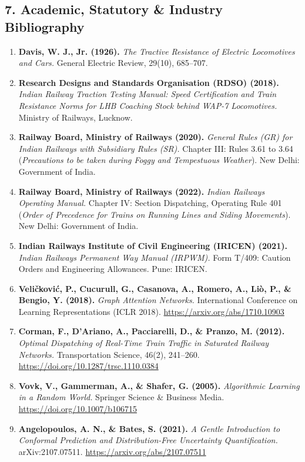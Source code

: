 \documentclass[10pt, a4paper]{article}
\begin{document}
\subsection*{7. Academic, Statutory \& Industry Bibliography}
\begin{enumerate}[leftmargin=5mm, itemsep=1.5pt]
  \item \textbf{Davis, W. J., Jr. (1926).} \textit{The Tractive Resistance of Electric Locomotives and Cars.} General Electric Review, 29(10), 685--707.
  \item \textbf{Research Designs and Standards Organisation (RDSO) (2018).} \textit{Indian Railway Traction Testing Manual: Speed Certification and Train Resistance Norms for LHB Coaching Stock behind WAP-7 Locomotives.} Ministry of Railways, Lucknow.
  \item \textbf{Railway Board, Ministry of Railways (2020).} \textit{General Rules (GR) for Indian Railways with Subsidiary Rules (SR).} Chapter III: Rules 3.61 to 3.64 (\textit{Precautions to be taken during Foggy and Tempestuous Weather}). New Delhi: Government of India.
  \item \textbf{Railway Board, Ministry of Railways (2022).} \textit{Indian Railways Operating Manual.} Chapter IV: Section Dispatching, Operating Rule 401 (\textit{Order of Precedence for Trains on Running Lines and Siding Movements}). New Delhi: Government of India.
  \item \textbf{Indian Railways Institute of Civil Engineering (IRICEN) (2021).} \textit{Indian Railways Permanent Way Manual (IRPWM).} Form T/409: Caution Orders and Engineering Allowances. Pune: IRICEN.
  \item \textbf{Veli\v{c}kovi\'{c}, P., Cucurull, G., Casanova, A., Romero, A., Li\`{o}, P., \& Bengio, Y. (2018).} \textit{Graph Attention Networks.} International Conference on Learning Representations (ICLR 2018). \url{https://arxiv.org/abs/1710.10903}
  \item \textbf{Corman, F., D'Ariano, A., Pacciarelli, D., \& Pranzo, M. (2012).} \textit{Optimal Dispatching of Real-Time Train Traffic in Saturated Railway Networks.} Transportation Science, 46(2), 241--260. \url{https://doi.org/10.1287/trsc.1110.0384}
  \item \textbf{Vovk, V., Gammerman, A., \& Shafer, G. (2005).} \textit{Algorithmic Learning in a Random World.} Springer Science \& Business Media. \url{https://doi.org/10.1007/b106715}
  \item \textbf{Angelopoulos, A. N., \& Bates, S. (2021).} \textit{A Gentle Introduction to Conformal Prediction and Distribution-Free Uncertainty Quantification.} arXiv:2107.07511. \url{https://arxiv.org/abs/2107.07511}

\end{enumerate}
\end{document}
